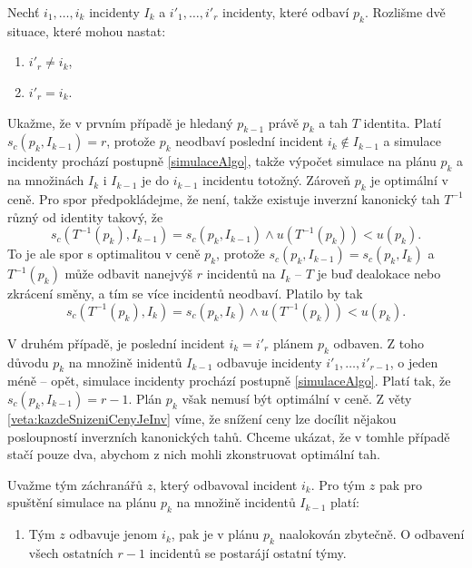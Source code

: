 \begin{dukaz}
  Nechť $i_1, \dots, i_k$ incidenty $I_k$ a $i'_1, \dots, i'_r$ incidenty, které odbaví $p_k$.
  Rozlišme dvě situace, které mohou nastat:
  \begin{enumerate}
    \item
      $i'_r \neq i_k$,

    \item
      $i'_r = i_k$.
  \end{enumerate}
  Ukažme, že v prvním případě je hledaný $p_{k-1}$ právě $p_k$ a tah $T$ identita.
  Platí $s_c(p_k, I_{k-1}) = r$, protože $p_k$ neodbaví poslední incident $i_k \not \in I_{k-1}$ a simulace incidenty prochází postupně \ref{simulaceAlgo},
  takže výpočet simulace na plánu $p_{k}$ a na množinách $I_k$ i $I_{k-1}$ je do $i_{k-1}$ incidentu totožný.
  Zároveň $p_k$ je optimální v ceně. Pro spor předpokládejme, že není, takže existuje inverzní kanonický tah $T^{-1}$ různý od identity takový,
  že
  \begin{equation*}
    s_c(T^{-1}(p_k), I_{k-1}) = s_c(p_k, I_{k-1}) \land u(T^{-1}(p_k)) < u(p_k).
  \end{equation*}
  To je ale spor s optimalitou v ceně $p_k$, protože $s_c(p_k, I_{k-1}) = s_c(p_k, I_k)$ a $T^{-1}(p_k)$ může odbavit nanejvýš $r$ incidentů na $I_k$ -- $T$ je buď dealokace nebo zkrácení směny,
  a tím se více incidentů neodbaví.
  Platilo by tak
  \begin{equation*}
    s_c(T^{-1}(p_k), I_{k}) = s_c(p_k, I_{k}) \land u(T^{-1}(p_k)) < u(p_k).
  \end{equation*}

  V druhém případě, je poslední incident $i_k = i'_r$ plánem $p_k$ odbaven.
  Z toho důvodu $p_k$ na množině inidentů $I_{k-1}$ odbavuje incidenty $i'_1, \dots, i'_{r-1}$, o jeden méně -- opět, simulace incidenty prochází postupně \ref{simulaceAlgo}.
  Platí tak, že $s_c(p_k, I_{k-1}) = r - 1$. Plán $p_k$ však nemusí být optimální v ceně.
  Z věty \ref{veta:kazdeSnizeniCenyJeInv} víme, že snížení ceny lze docílit nějakou posloupností inverzních kanonických tahů.
  Chceme ukázat, že v tomhle případě stačí pouze dva, abychom z nich mohli zkonstruovat optimální tah.

  Uvažme tým záchranářů $z$, který odbavoval incident $i_k$.
  Pro tým $z$ pak pro spuštění simulace na plánu $p_k$ na množině incidentů $I_{k-1}$ platí:

  \begin{enumerate}
    \item
      Tým $z$ odbavuje jenom $i_k$, pak je v plánu $p_k$ naalokován zbytečně. O odbavení všech ostatních $r-1$ incidentů se postarájí ostatní týmy.


\end{enumerate}
\end{dukaz}
